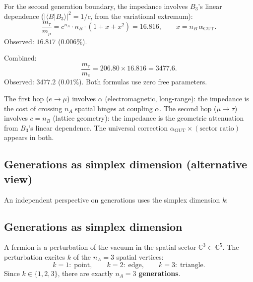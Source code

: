 For the second generation boundary, the impedance involves $B_3$'s linear dependence ($|\langle B|B_3\rangle|^2 = 1/c$, from the variational extremum):
\begin{equation}
\label{eq:tau_mu}
\boxed{\frac{m_\tau}{m_\mu} = c^{n_A}\cdot n_B \cdot \left(1 + x + x^2\right) = 16.816, \qquad x = n_B\,\alpha_\mathrm{GUT}.}
\end{equation}
Observed: $16.817$ ($0.006\%$).

Combined:
\begin{equation}
\label{eq:tau_e}
\frac{m_\tau}{m_e} = 206.80 \times 16.816 = 3477.6.
\end{equation}
Observed: $3477.2$ ($0.01\%$).  Both formulas use zero free parameters.

\begin{remark}
The first hop ($e \to \mu$) involves $\alpha$ (electromagnetic, long-range): the impedance is the cost of crossing $n_A$ spatial hinges at coupling $\alpha$.  The second hop ($\mu \to \tau$) involves $c = n_B$ (lattice geometry): the impedance is the geometric attenuation from $B_3$'s linear dependence.  The universal correction $\alpha_\mathrm{GUT} \times (\text{sector ratio})$ appears in both.
\end{remark}

\subsection{Generations as simplex dimension (alternative view)}
\label{sec:gen_alt}

An independent perspective on generations uses the simplex dimension $k$:

\subsection{Generations as simplex dimension}

A fermion is a perturbation of the vacuum in the spatial sector $\mathbb{C}^3 \subset \mathbb{C}^5$. The perturbation excites $k$ of the $n_A = 3$ spatial vertices:
\begin{equation}
k = 1:\;\text{point}, \qquad k = 2:\;\text{edge}, \qquad k = 3:\;\text{triangle}.
\end{equation}
Since $k \in \{1, 2, 3\}$, there are exactly $n_A = 3$ \textbf{generations}.

